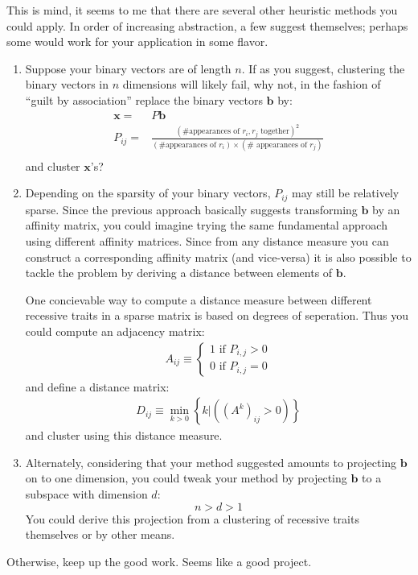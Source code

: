 \documentclass[12pt,draft,a4paper]{article}
\begin{document}
This is mind, it seems to me that there are several other heuristic methods you could apply. In order of increasing abstraction, a few suggest themselves; perhaps some would work for your application in some flavor.
\begin{enumerate} 
\item{Suppose your binary vectors are of length $n$. If as you suggest, clustering the binary vectors in $n$ dimensions will likely fail, why not, in the fashion of ``guilt by association'' replace the binary vectors $\mathbf{b}$ by:
\begin{align*}
\mathbf{x} =& P\mathbf{b} \\
P_{ij} =& \frac{(\#\text{appearances of } r_i, r_j \text{ together})^2}{
(\#\text{appearances of } r_i)\times (\#\text{ appearances of } r_j)
}\\
\end{align*}
and cluster $\mathbf{x}$'s?

}
\item{
Depending on the sparsity of your binary vectors, $P_{ij}$ may still be relatively sparse. Since the previous approach basically suggests transforming $\mathbf{b}$ by an affinity matrix, you could imagine trying the same fundamental approach using different affinity matrices. Since from any distance measure you can construct a corresponding affinity matrix (and vice-versa) it is also possible to tackle the problem by deriving a distance between elements of $\mathbf{b}$.

\begin{samepage}
One concievable way to compute a distance measure between different recessive traits in a sparse matrix is based on degrees of seperation. Thus you could compute an adjacency matrix:
\begin{align*}
A_{ij} \equiv \begin{cases}1 \text{ if } P_{i,j} > 0 \\ 0 \text{ if } P_{i,j} = 0 \end{cases}
\end{align*}
and define a distance matrix:
\begin{align*}
D_{ij} \equiv \min_{k > 0} \left\{ k | \left( \left( A^k \right) _{ij} > 0 \right) \right\}
\end{align*}
and cluster using this distance measure.
\end{samepage}
}


\item{
Alternately, considering that your method suggested amounts to projecting $\mathbf{b}$ on to one dimension, you could tweak your method by projecting $\mathbf{b}$ to a subspace with dimension $d$:\begin{equation} n > d > 1\end{equation} You could derive this projection from a clustering of recessive traits themselves or by other means.  
}
\end{enumerate}

Otherwise, keep up the good work. Seems like a good project.

\end{document}
